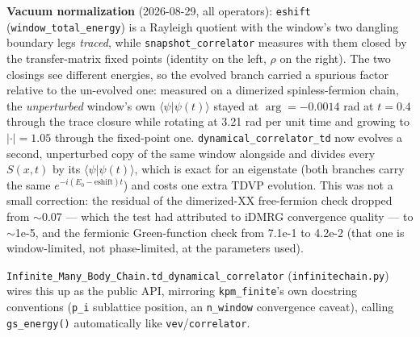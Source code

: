 \documentclass[11pt]{article}
\begin{document}
\textbf{Vacuum normalization} (2026-08-29, all operators):
\texttt{eshift} (\texttt{window\_total\_energy}) is a Rayleigh quotient
with the window's two dangling boundary legs \emph{traced}, while
\texttt{snapshot\_correlator} measures with them closed by the
transfer-matrix fixed points (identity on the left, $\rho$ on the right).
The two closings see different energies, so the evolved branch carried a
spurious factor relative to the un-evolved one: measured on a dimerized
spinless-fermion chain, the \emph{unperturbed} window's own
$\langle\psi|\psi(t)\rangle$ stayed at $\arg = -0.0014$ rad at $t=0.4$
through the trace closure while rotating at 3.21 rad per unit time and
growing to $|\cdot| = 1.05$ through the fixed-point one.
\texttt{dynamical\_correlator\_td} now evolves a second, unperturbed copy
of the same window alongside and divides every $S(x,t)$ by its
$\langle\psi|\psi(t)\rangle$, which is exact for an eigenstate (both
branches carry the same $e^{-i(E_0-\mathrm{eshift})t}$) and costs one
extra TDVP evolution. This was not a small correction: the residual of
the dimerized-XX free-fermion check dropped from $\sim$0.07 --- which the
test had attributed to iDMRG convergence quality --- to $\sim$1e-5, and
the fermionic Green-function check from 7.1e-1 to 4.2e-2 (that one is
window-limited, not phase-limited, at the parameters used).

\texttt{Infinite\_Many\_Body\_Chain.td\_dynamical\_correlator}
(\texttt{infinitechain.py}) wires this up as the public API, mirroring
\texttt{kpm\_finite}'s own docstring conventions (\texttt{p\_i}
sublattice position, an \texttt{n\_window} convergence caveat), calling
\texttt{gs\_energy()} automatically like \texttt{vev}/\texttt{correlator}.
\end{document}
